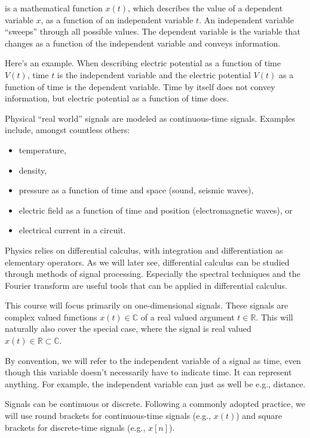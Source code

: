  is a mathematical function $x(t)$, which
describes the value of a  dependent variable
$x$, as a function of an independent
variable $t$. An independent variable ``sweeps'' through all possible
values. The dependent variable is the variable that changes as a
function of the independent variable and conveys information.

Here's an example. When describing electric potential as a function of
time $V(t)$, time $t$ is the independent variable and the electric
potential $V(t)$ as a function of time is the dependent variable. Time
by itself does not convey information, but electric potential as a
function of time does.

Physical ``real world'' signals are modeled as continuous-time
signals. Examples include, amongst countless others:
\begin{itemize}
 \setlength\itemsep{0.25em}        
\item temperature,
\item density,
\item pressure as a function of time and space (sound, seismic waves),
\item electric field as a function of time and position
  (electromagnetic waves), or
\item electrical current in a circuit.
\end{itemize}
Physics relies on differential calculus, with integration and
differentiation as elementary operators. As we will later see,
differential calculus can be studied through methods of signal
processing. Especially the spectral techniques and the Fourier
transform are useful tools that can be applied in differential
calculus.

This course will focus primarily on one-dimensional signals. These
signals are complex valued functions $x(t) \in \mathbb{C}$ of a real
valued argument $t\in \mathbb{R}$. This will naturally also cover the
special case, where the signal is real valued
$x(t) \in \mathbb{R} \subset
\mathbb{C}$. 

By convention, we will refer to the independent variable of a signal
as time, even though this variable doesn't necessarily have to
indicate time. It can represent anything. For example, the independent
variable can just as well be e.g., distance.

Signals can be continuous or discrete. Following a commonly adopted
practice, we will use round brackets for continuous-time signals
(e.g., $x(t)$) and square brackets for discrete-time signals (e.g.,
$x[n]$). 

